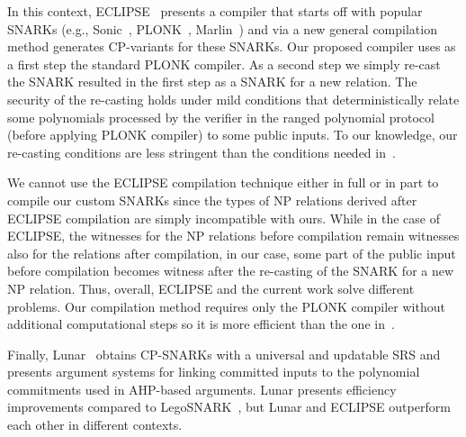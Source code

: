 \begin{comment}
In practice, commit-and-prove systems (for short, CP) can be used to compress a large data structure and then prove something about its
content (e.g., polynomial commitments~\cite{KZG_10}, vector commitments~\cite{vector_commitment_1}, accumulators~\cite{first_accumulator}).
CP schemes can also be used to decouple the publishing of commitments to some data from the proof generation: each of these actions may be
performed by different parties or entities~\cite{zkp_reference}. Finally, commitments can be used to make different proof systems
interoperable~\cite{CP_paper,interoperability_2}. Our SNARKs have properties from the first two categories, however we could not
have simply re-used an existing argument system: by designing custom circuits and SNARKs, we ensured improved efficiency for our use cases.
\vspace{-0.1in}
\end{comment}


In this context, ECLIPSE~\cite{eclipse} presents a compiler that starts off with popular SNARKs (e.g., Sonic~\cite{sonic}, PLONK~\cite{plonk},
Marlin~\cite{marlin}) and via a new general compilation method generates CP-variants for these SNARKs.
Our proposed compiler uses as a first step the standard PLONK compiler.  As a second step we simply
re-cast the SNARK resulted in the first step as a SNARK for a new relation.
The security of the re-casting holds under mild conditions that deterministically relate some polynomials
processed by the verifier in the ranged polynomial protocol (before applying PLONK compiler) to some
public inputs. To our knowledge, our re-casting conditions are less stringent than the conditions needed
in~\cite{eclipse}.

We cannot use the ECLIPSE compilation technique either in full or in part to compile our custom SNARKs
since the types of NP relations derived after ECLIPSE compilation are simply incompatible with ours. While in the
case of ECLIPSE, the witnesses for the NP relations before compilation remain witnesses also for the relations
after compilation, in our case, some part of the public input before compilation becomes witness after the
re-casting of the SNARK for a new NP relation. Thus, overall, ECLIPSE and the current work solve different problems.
Our compilation method requires only the PLONK compiler without additional computational
steps so it is more efficient than the one in~\cite{eclipse}.

Finally, Lunar~\cite{lunar} obtains CP-SNARKs with a universal and updatable SRS and presents argument systems for
linking committed inputs to the polynomial commitments used in AHP-based arguments. Lunar presents efficiency improvements compared
to LegoSNARK~\cite{CP_paper}, but Lunar and ECLIPSE outperform each other  in different contexts.


